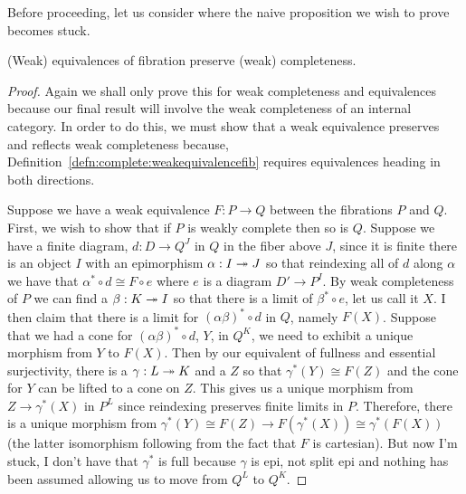 Before proceeding, let us consider where the naive proposition we wish
to prove becomes stuck.
\begin{prop}\label{prop:complete:completefibrationbroken}
  (Weak) equivalences of fibration preserve (weak) completeness.
\end{prop}
\begin{proof}
  \renewcommand{\qed}{\hfill \color{red}{\large \textsf{X}}}
  Again we shall only prove this for weak completeness and
  equivalences because our final result will involve the weak
  completeness of an internal category. In order to do this, we must
  show that a weak equivalence preserves and reflects weak
  completeness because,
  Definition~\ref{defn:complete:weakequivalencefib} requires
  equivalences heading in both directions.

  Suppose we have a weak equivalence $F : P \to Q$ between the
  fibrations $P$ and $Q$. First, we wish to show that if $P$ is weakly
  complete then so is $Q$. Suppose we have a finite diagram,
  $d : D \to Q^J$ in $Q$ in the fiber above $J$, since it is finite
  there is an object $I$ with an epimorphism $\alpha : I \twoheadrightarrow J$ so
  that reindexing all of $d$ along $\alpha$ we have that
  $\alpha^* \circ d \cong F \circ e$ where $e$ is a diagram
  $D' \to P^I$. By weak completeness of $P$ we can find a
  $\beta : K \twoheadrightarrow I$ so that there is a limit of $\beta^* \circ e$,
  let us call it $X$. I then claim that there is a limit for
  $(\alpha\beta)^* \circ d$ in $Q$, namely $F(X)$. Suppose that we had
  a cone for $(\alpha\beta)^* \circ d$, $Y$, in $Q^K$, we need to
  exhibit a unique morphism from $Y$ to $F(X)$. Then by our equivalent
  of fullness and essential surjectivity, there is a
  $\gamma : L \twoheadrightarrow K$ and a $Z$ so that $\gamma^*(Y) \cong F(Z)$ and
  the cone for $Y$ can be lifted to a cone on $Z$. This gives us a
  unique morphism from $Z \to \gamma^*(X)$ in $P^L$ since reindexing
  preserves finite limits in $P$. Therefore, there is a unique
  morphism from
  $\gamma^*(Y) \cong F(Z) \to F(\gamma^*(X)) \cong \gamma^*(F(X))$
  (the latter isomorphism following from the fact that $F$ is
  cartesian). But now I'm stuck, I don't have that $\gamma^*$ is full
  because $\gamma$ is epi, not split epi and nothing has been assumed
  allowing us to move from $Q^L$ to $Q^K$.
\end{proof}
\renewcommand{\qed}{\hfill\ensuremath{\Box}}

